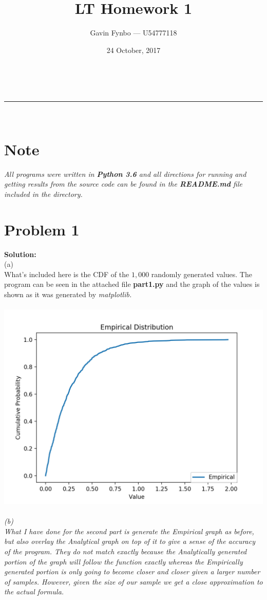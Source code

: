 \documentclass[letterpaper,11pt]{article}
\makeatletter
\newcommand{\linia}{\rule{\linewidth}{0.5pt}}
\theoremstyle{mytheor}
\renewcommand{\maketitle}{
\begin{center}
\vspace{2ex}
{\huge \textsc{\@title}}
\vspace{1ex}
\\
\linia\\
\@author \hfill \@date
\vspace{4ex}
\end{center}
}
\makeatother
\begin{document}
\title{LT Homework 1}

\author{Gavin Fynbo --- U54777118}

\date{24 October, 2017}

\maketitle

\section*{Note}
\em All programs were written in \textbf{Python 3.6} and all directions for running and getting results from the source code can be found in the \textbf{README.md} file included in the directory. \em
\section*{Problem 1}
\textbf{Solution:}\\
(a)\\
What's included here is the CDF of the $1,000$ randomly generated values. The program can be seen in the attached file \textbf{part1.py} and the graph of the values is shown as it was generated by \em matplotlib\em .\\
\\
\includegraphics[scale=1]{Empirical.png}\\
\\
(b)\\
What I have done for the second part is generate the Empirical graph as before, but also overlay the Analytical graph on top of it to give a sense of the accuracy of the program. They do not match exactly because the Analytically generated portion of the graph will follow the function exactly whereas the Empirically generated portion is only going to become closer and closer given a larger number of samples. However, given the size of our sample we get a close approximation to the actual formula.\\
\end{document}
